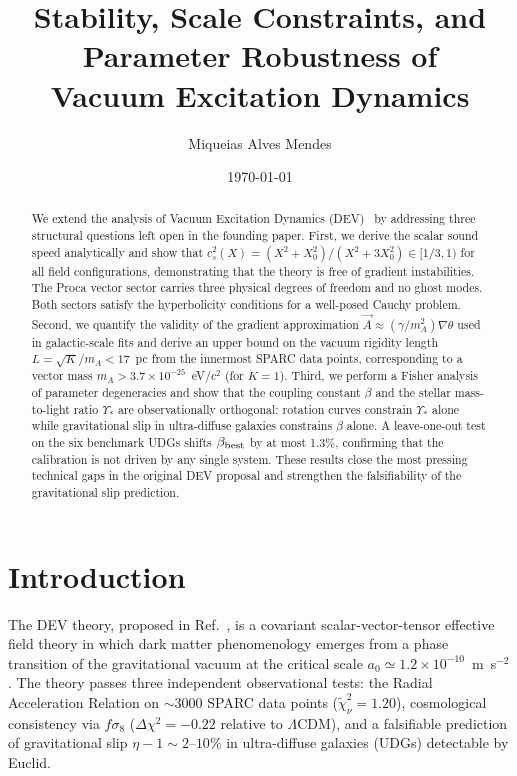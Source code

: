 \documentclass[aps,prd,reprint,floatfix,nofootinbib,superscriptaddress]{revtex4-2}
\newcommand{\aO}{a_0}
\newcommand{\Xzero}{X_0}
\newcommand{\cs}{c_s}
\begin{document}
\title{Stability, Scale Constraints, and Parameter Robustness of\\
       Vacuum Excitation Dynamics}

\author{Miqueias Alves Mendes}

\date{\today}

\begin{abstract}
We extend the analysis of Vacuum Excitation Dynamics (DEV)~\cite{Mendes2026}
by addressing three structural questions left open in the founding paper.
First, we derive the scalar sound speed analytically and show that
$\cs^2(X) = (X^2 + \Xzero^2)/(X^2 + 3\Xzero^2) \in [1/3,1)$ for all
field configurations, demonstrating that the theory is free of
gradient instabilities. The Proca vector sector carries three physical
degrees of freedom and no ghost modes. Both sectors satisfy the
hyperbolicity conditions for a well-posed Cauchy problem.
Second, we quantify the validity of the gradient approximation
$\vec{A}\approx(\gamma/m_A^2)\nabla\theta$ used in galactic-scale fits
and derive an upper bound on the vacuum rigidity length
$L = \sqrt{K}/m_A < 17$~pc from the innermost SPARC data points,
corresponding to a vector mass $m_A > 3.7\times10^{-25}$~eV/$c^2$
(for $K=1$). Third, we perform a Fisher analysis of parameter
degeneracies and show that the coupling constant $\beta$ and the
stellar mass-to-light ratio $\Upsilon_*$ are observationally
orthogonal: rotation curves constrain $\Upsilon_*$ alone while
gravitational slip in ultra-diffuse galaxies constrains $\beta$ alone.
A leave-one-out test on the six benchmark UDGs shifts $\beta_{\rm best}$
by at most 1.3\%, confirming that the calibration is not driven by
any single system. These results close the most pressing technical
gaps in the original DEV proposal and strengthen the falsifiability
of the gravitational slip prediction.
\end{abstract}

\maketitle

\section{Introduction}

The DEV theory, proposed in Ref.~\cite{Mendes2026}, is a covariant
scalar-vector-tensor effective field theory in which dark matter
phenomenology emerges from a phase transition of the gravitational
vacuum at the critical scale $\aO\simeq 1.2\times10^{-10}$~m~s$^{-2}$.
The theory passes three independent observational tests:
the Radial Acceleration Relation on $\sim$3000 SPARC data points
($\widetilde{\chi}^2_\nu=1.20$), cosmological consistency via
$f\sigma_8$ ($\Delta\chi^2 = -0.22$ relative to $\Lambda$CDM), and a
falsifiable prediction of gravitational slip $\eta-1\sim 2\text{--}10\%$
in ultra-diffuse galaxies (UDGs) detectable by Euclid.
\end{document}
